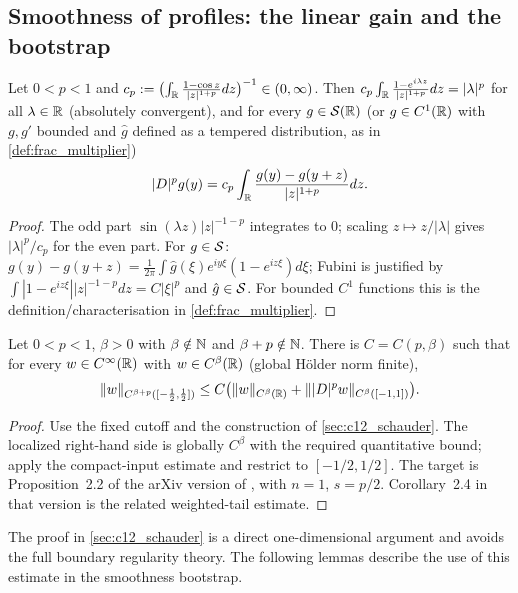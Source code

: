 \subsection{Smoothness of profiles: the linear gain and the bootstrap}

\begin{lemma}
  \label{lem:c03_frac_kernel_formula}
  Let $0<p<1$ and $c_p:=\bigl(\int_{\mathbb{R}}\frac{1-\cos z}{|z|^{1+p}}dz\bigr)^{-1}\in(0,\infty)$. Then
  $c_p\int_{\mathbb{R}}\frac{1-e^{i\lambda z}}{|z|^{1+p}}dz=|\lambda|^p$ for all $\lambda\in\mathbb{R}$ (absolutely convergent), and for every $g\in\mathcal{S}(\mathbb{R})$ (or $g\in C^1(\mathbb{R})$ with $g,g'$ bounded and $\hat g$ defined as a tempered distribution, as in \cref{def:frac_multiplier})
  \[
    |D|^pg(y)=c_p\int_{\mathbb{R}}\frac{g(y)-g(y+z)}{|z|^{1+p}}dz .
  \]
\end{lemma}
\begin{proof}
  The odd part $\sin(\lambda z)|z|^{-1-p}$ integrates to $0$; scaling $z\mapsto z/|\lambda|$ gives $|\lambda|^p/c_p$ for the even part. For $g\in\mathcal{S}$:
  $g(y)-g(y+z)=\frac1{2\pi}\int\hat g(\xi)e^{iy\xi}(1-e^{iz\xi})d\xi$; Fubini is justified by $\int|1-e^{iz\xi}||z|^{-1-p}dz=C|\xi|^p$ and $\hat g\in\mathcal{S}$.
  For bounded $C^1$ functions this is the definition/characterisation in \cref{def:frac_multiplier}.
\end{proof}

\begin{lemma}
  \label{lem:c03_schauder_RS}
  Let $0<p<1$, $\beta>0$ with $\beta\notin\mathbb{N}$ and $\beta+p\notin\mathbb{N}$. There is $C=C(p,\beta)$ such that for every $w\in C^\infty(\mathbb{R})$ with $w\in C^\beta(\mathbb{R})$ (global H\"older norm finite),
  \[
    \|w\|_{C^{\beta+p}([-\frac12,\frac12])}\le C\bigl(\|w\|_{C^\beta(\mathbb{R})}+\||D|^pw\|_{C^\beta([-1,1])}\bigr).
  \]
\end{lemma}
\begin{proof}
  Use the fixed cutoff and the construction of \cref{sec:c12_schauder}.
  The localized right-hand side is globally $C^\beta$ with the required quantitative bound;
  apply the compact-input estimate and restrict to $[-1/2,1/2]$.
  The target is Proposition~2.2 of the arXiv version of
  \cite{RosOton-Serra:dirichlet-fractional-laplacian}, with $n=1$, $s=p/2$.
  Corollary~2.4 in that version is the related weighted-tail estimate.
\end{proof}
\begin{remark}
  The proof in \cref{sec:c12_schauder} is a direct one-dimensional argument and avoids
  the full boundary regularity theory. The following lemmas describe the use of this estimate in
  the smoothness bootstrap.
\end{remark}


